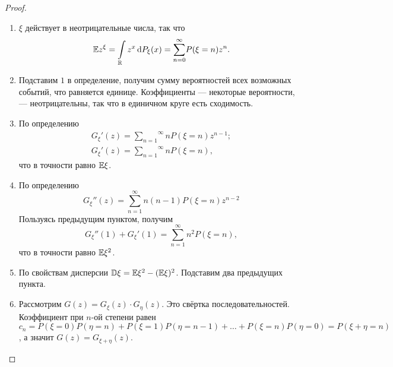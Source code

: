 \begin{proof}
 \enewline
 \begin{enumerate}
     \item $\xi$ действует в неотрицательные числа, так что
     $$\EE z^\xi = \int_\mathbb{R} z^x \dd P_\xi(x) = \overset{\infty}{\underset{n = 0}{\sum}} P(\xi = n)z^n.$$
     \item Подставим $1$ в определение, получим сумму вероятностей всех возможных событий, что равняется единице. Коэффициенты --- некоторые вероятности, --- неотрицательны, так что в единичном круге есть сходимость.
     \item По определению
     \begin{gather*}
         G_\xi'(z) = \overset{\infty}{\underset{n = 1}{\sum}}nP(\xi = n)z^{n - 1};\\
         G_\xi'(z) = \overset{\infty}{\underset{n = 1}{\sum}}nP(\xi = n),
     \end{gather*}
     что в точности равно $\mathbb{E} \xi$.
     \item По определению
      $$G_\xi''(z) = \overset{\infty}{\underset{n = 1}{\sum}}n(n - 1)P(\xi = n)z^{n - 2}$$
      Пользуясь предыдущим пунктом, получим
      $$G_\xi''(1) + G_\xi'(1) = \overset{\infty}{\underset{n = 1}{\sum}}n^2P(\xi = n),$$
      что в точности равно $\mathbb{E} \xi^2$.
      \item По свойствам дисперсии $\mathbb{D} \xi = \mathbb{E} \xi^2 - (\mathbb{E} \xi)^2$. Подставим два предыдущих пункта.
      \item Рассмотрим $G(z) = G_\xi(z)\cdot G_\eta(z)$. Это свёртка последовательностей. Коэффициент при $n$-ой степени равен  $c_n = P(\xi = 0)P(\eta = n) + P(\xi =1 )P(\eta = n - 1) + \ldots + P(\xi = n)P(\eta = 0) = P(\xi + \eta = n)$, а значит $G(z) = G_{\xi + \eta}(z)$. \qedhere
 \end{enumerate}
\end{proof}


